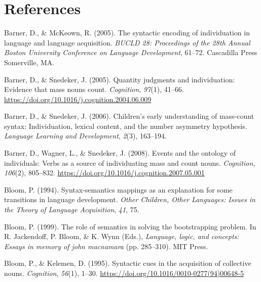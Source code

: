\documentclass[
  man,floatsintext]{apa6}
\newlength{\cslhangindent}
\newlength{\cslentryspacingunit} %
\newenvironment{CSLReferences}[2] %
 {%
  \setlength{\parindent}{0pt}
  \ifodd #1
  \let\oldpar\par
  \def\par{\hangindent=\cslhangindent\oldpar}
  \fi
  \setlength{\parskip}{#2\cslentryspacingunit}
 }%
 {}
\begin{document}
\newpage

\hypertarget{references}{%
\section{References}\label{references}}

\hypertarget{refs}{}
\begin{CSLReferences}{1}{0}
\leavevmode{}%
Barner, D., \& McKeown, R. (2005). The syntactic encoding of individuation in language and language acquisition. \emph{BUCLD 28: Proceedings of the 28th Annual Boston University Conference on Language Development}, 61--72. Cascadilla Press Somerville, MA.

\leavevmode{}%
Barner, D., \& Snedeker, J. (2005). Quantity judgments and individuation: Evidence that mass nouns count. \emph{Cognition}, \emph{97}(1), 41--66. \url{https://doi.org/10.1016/j.cognition.2004.06.009}

\leavevmode{}%
Barner, D., \& Snedeker, J. (2006). Children's early understanding of mass-count syntax: Individuation, lexical content, and the number asymmetry hypothesis. \emph{Language Learning and Development}, \emph{2}(3), 163--194.

\leavevmode{}%
Barner, D., Wagner, L., \& Snedeker, J. (2008). Events and the ontology of individuals: {Verbs} as a source of individuating mass and count nouns. \emph{Cognition}, \emph{106}(2), 805--832. \url{https://doi.org/10.1016/j.cognition.2007.05.001}

\leavevmode{}%
Bloom, P. (1994). Syntax-semantics mappings as an explanation for some transitions in language development. \emph{Other Children, Other Languages: Issues in the Theory of Language Acquisition}, \emph{41}, 75.

\leavevmode{}%
Bloom, P. (1999). The role of semantics in solving the bootstrapping problem. In R. Jackendoff, P. Bloom, \& K. Wynn (Eds.), \emph{Language, logic, and concepts: Essays in memory of john macnamara} (pp. 285--310). MIT Press.

\leavevmode{}%
Bloom, P., \& Kelemen, D. (1995). Syntactic cues in the acquisition of collective nouns. \emph{Cognition}, \emph{56}(1), 1--30. \url{https://doi.org/10.1016/0010-0277(94)00648-5}


\end{CSLReferences}
\end{document}
